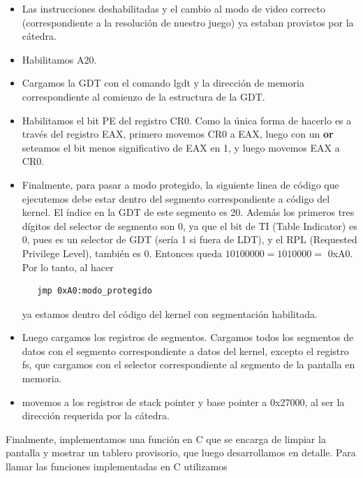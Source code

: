 \documentclass[a4paper]{article}
\newenvironment{codesnippet}{%
	\begin{Sbox}\begin{minipage}{\textwidth}\sffamily\small}%
	{\end{minipage}\end{Sbox}%
		\begin{center}%
		\vspace{-0.4cm}\colorbox{litegrey}{\TheSbox}\end{center}\vspace{0.3cm}}
\begin{document}
\begin{itemize}
	\item Las instrucciones deshabilitadas y el cambio al modo de video correcto (correspondiente a la resolución de
	nuestro juego) ya estaban provistos por la cátedra.

	\item Habilitamos A20.
	
	\item Cargamos la GDT con el comando lgdt y la dirección de memoria correspondiente al comienzo de la estructura de la
	GDT.

	\item Habilitamos el bit PE del registro CR0. Como la única forma de hacerlo es a través del registro EAX, primero
	movemos CR0 a EAX, luego con un \textbf{or} seteamos el bit menos significativo de EAX en 1, y luego movemos EAX a CR0.
	
	\item Finalmente, para pasar a modo protegido, la siguiente linea de código que ejecutemos debe estar dentro del
	segmento correspondiente a código del kernel. El índice en la GDT de este segmento es 20. Además los primeros tres
	dígitos del selector de segmento son 0, ya que el bit de TI (Table Indicator) es 0, pues es un selector de GDT (sería 1
	si fuera de LDT), y el RPL (Requested Privilege Level), también es 0. Entonces queda $10100000 = 1010 000 =$ 0xA0. Por
	lo tanto, al hacer
	\begin{codesnippet}
  \begin{verbatim}
   jmp 0xA0:modo_protegido
	  \end{verbatim}
\end{codesnippet}

	ya estamos dentro del código del kernel con segmentación habilitada.
	
	\item Luego cargamos los registros de segmentos. Cargamos todos los segmentos de datos con el segmento correspondiente
	a datos del kernel, excepto el registro fs, que cargamos con el selector correspondiente al segmento de la pantalla en
	memoria.
	
	\item movemos a los registros de stack pointer y base pointer a 0x27000, al ser la dirección requerida por la cátedra.
	
\end{itemize}

Finalmente, implementamos una función en C que se encarga de limpiar la pantalla y mostrar un tablero provisorio, que
luego desarrollamos en detalle. Para llamar las funciones implementadas en C utilizamos 
\end{document}

